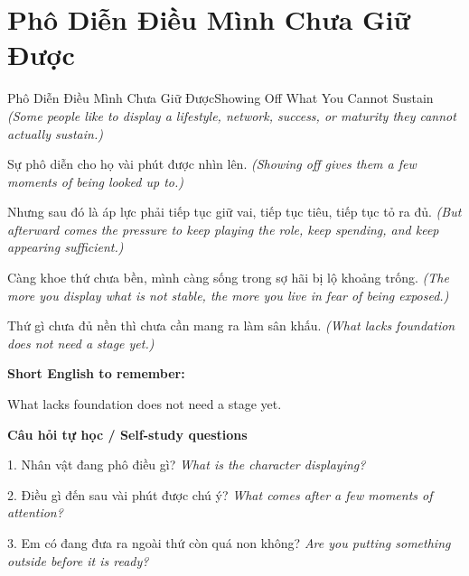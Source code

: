 \section{Phô Diễn Điều Mình Chưa Giữ Được}
\begin{truyen}{Phô Diễn Điều Mình Chưa Giữ Được}{Showing Off What You Cannot Sustain}
\textit{(Some people like to display a lifestyle, network, success, or maturity they cannot actually sustain.)}

Sự phô diễn cho họ vài phút được nhìn lên.
\textit{(Showing off gives them a few moments of being looked up to.)}

Nhưng sau đó là áp lực phải tiếp tục giữ vai, tiếp tục tiêu, tiếp tục tỏ ra đủ.
\textit{(But afterward comes the pressure to keep playing the role, keep spending, and keep appearing sufficient.)}

Càng khoe thứ chưa bền, mình càng sống trong sợ hãi bị lộ khoảng trống.
\textit{(The more you display what is not stable, the more you live in fear of being exposed.)}

\end{truyen}

\begin{baihoc}
Thứ gì chưa đủ nền thì chưa cần mang ra làm sân khấu.
\textit{(What lacks foundation does not need a stage yet.)}
\end{baihoc}

\begin{ghinhoanh}
\textbf{Short English to remember:}

What lacks foundation does not need a stage yet.

\end{ghinhoanh}

\begin{tuhocnhanh}
\textbf{Câu hỏi tự học / Self-study questions}

1. Nhân vật đang phô điều gì? \textit{What is the character displaying?}

2. Điều gì đến sau vài phút được chú ý? \textit{What comes after a few moments of attention?}

3. Em có đang đưa ra ngoài thứ còn quá non không? \textit{Are you putting something outside before it is ready?}
\end{tuhocnhanh}
\ngancach

